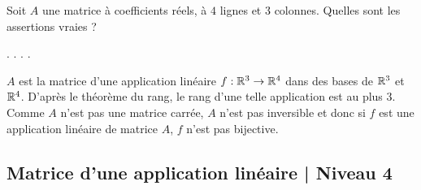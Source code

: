 \begin{question}
Soit $A$ une matrice à coefficients réels, à $4$ lignes et $3$ colonnes. Quelles sont les assertions vraies ?
\begin{answers} 
.
.
.
.
\end{answers}
\begin{explanations} $A$ est la matrice d'une application linéaire $f: \mathbb{R}^3 \to \mathbb{R}^4$ dans des bases de  $\mathbb{R}^3$ et $\mathbb{R}^4$.  
D'après le théorème du rang, le rang d'une telle application est au plus $3$.
\vskip0mm
Comme $A$ n'est pas une matrice carrée, $A$ n'est pas inversible et donc si $f$ est une application linéaire de matrice $A$, $f$ n'est pas bijective.
\end{explanations}
\end{question}



\subsection{Matrice d'une application linéaire | Niveau 4}

